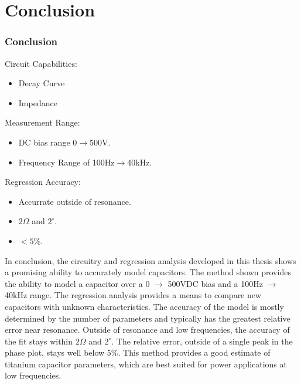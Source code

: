 \section {Conclusion}
\label{sec:conclusion}

\ifisPPT
\begin{frame}
    \frametitle{Conclusion}

Circuit Capabilities:
\begin{itemize}
    \item Decay Curve
    \item Impedance
\end{itemize}

Measurement Range:
\begin{itemize}
    \item DC bias range 0$\rightarrow$500V.
    \item Frequency Range of 100Hz$\rightarrow$40kHz.
\end{itemize}

Regression Accuracy:
\begin{itemize}
    \item Accurrate outside of resonance.
    \item $2 \Omega$ and $2^{\circ}$.
    \item $<5\%$.
\end{itemize}
\end{frame}
\else
In conclusion, the circuitry and regression analysis developed in this thesis shows a promising ability to accurately model capacitors. The method shown provides the ability to model a capacitor over a 0 $\rightarrow$ 500VDC bias and a 100Hz $\rightarrow$ 40kHz range. The regression analysis provides a means to compare new capacitors with unknown characteristics. The accuracy of the model is mostly determined by the number of parameters and typically has the greatest relative error near resonance. Outside of resonance and low frequencies, the accuracy of the fit stays within $2 \Omega$ and $2^{\circ}$. The relative error, outside of a single peak in the phase plot, stays well below $5\%$. This method provides a good estimate of titanium capacitor parameters, which are best suited for power applications  at low frequencies.
\fi

